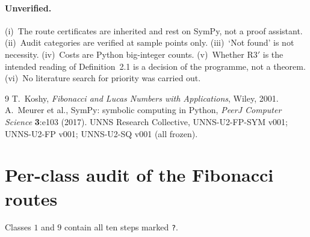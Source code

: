 \documentclass[11pt]{article}
\theoremstyle{definition}
\theoremstyle{remark}
\begin{document}
\paragraph{Unverified.} (i)~The route certificates are inherited and rest on SymPy, not a proof assistant. (ii)~Audit categories are verified at sample points only. (iii)~`Not found' is not necessity. (iv)~Costs are Python big-integer counts. (v)~Whether R3$'$ is the intended reading of Definition~2.1 is a decision of the programme, not a theorem. (vi)~No literature search for priority was carried out.

\begin{thebibliography}{9}
 T.~Koshy, \emph{Fibonacci and Lucas Numbers with Applications}, Wiley, 2001.
 A.~Meurer et al., SymPy: symbolic computing in Python, \emph{PeerJ Computer Science} \textbf{3}:e103 (2017).
 UNNS Research Collective, UNNS-U2-FP-SYM v001; UNNS-U2-FP v001; UNNS-U2-SQ v001 (all frozen).
\end{thebibliography}

\appendix
\section{Per-class audit of the Fibonacci routes}
\begin{center}\small\end{center}
Classes $1$ and $9$ contain all ten steps marked \texttt{?}.
\end{document}
